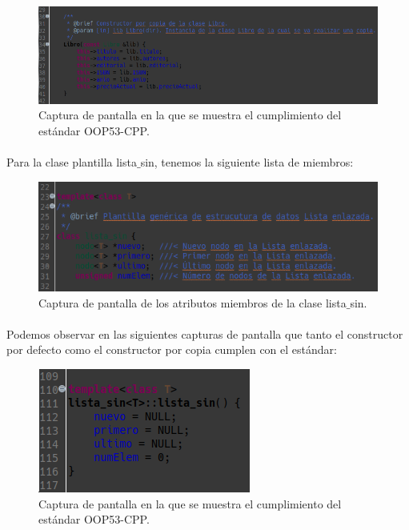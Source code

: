 			\begin{figure}[H]
				\centering
				\includegraphics[scale=0.55]{img/captura16.png}
				\caption{Captura de pantalla en la que se muestra el cumplimiento del estándar OOP53-CPP.}
				\label{captura16}
			\end{figure}
		
			\paragraph{}Para la clase plantilla lista$\_$sin, tenemos la siguiente lista de miembros:
			
			\begin{figure}[H]
				\centering
				\includegraphics[scale=0.6]{img/captura17.png}
				\caption{Captura de pantalla de los atributos miembros de la clase lista$\_$sin.}
				\label{captura17}
			\end{figure}
			
			\paragraph{}Podemos observar en las siguientes capturas de pantalla que tanto el constructor por defecto como el constructor por copia cumplen con el estándar:
			
			\begin{figure}[H]
				\centering
				\includegraphics[scale=0.7]{img/captura18.png}
				\caption{Captura de pantalla en la que se muestra el cumplimiento del estándar OOP53-CPP.}
				\label{captura18}
			\end{figure}
			
